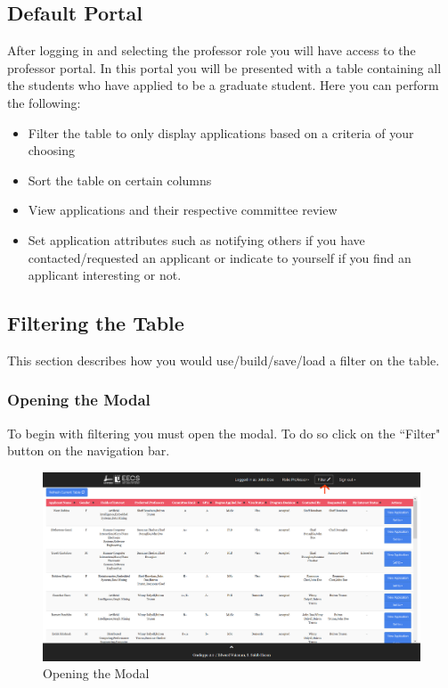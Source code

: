 \documentclass[fontsize=12pt,paper=letter,twoside]{scrartcl}
\begin{document}
\subsection{Default Portal}
After logging in and selecting the professor role you will have access to the professor portal. In this portal you will be presented with a table containing all the students who have applied to be a graduate student. Here you can perform the following:
\begin{itemize}
\item Filter the table to only display applications based on a criteria of your choosing
\item Sort the table on certain columns
\item View applications and their respective committee review
\item Set application attributes such as notifying others if you have contacted/requested an applicant or indicate to yourself if you find an applicant interesting or not.
\end{itemize}

\subsection{Filtering the Table}
This section describes how you would use/build/save/load a filter on the table.

\newpage
\subsubsection{Opening the Modal}
To begin with filtering you must open the modal. To do so click on the ``Filter" button on the navigation bar.

\begin{figure}[!htb]
\begin{center}
\includegraphics[width=.99\textwidth]{images/prof/open_modal.png}
\end{center}
\caption{Opening the  Modal}
\label{fig:prof/open_modal}
\end{figure}
\end{document}
